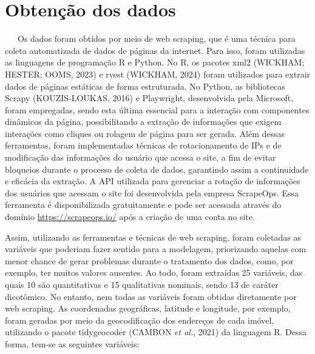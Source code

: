 \documentclass[
  12pt,
  a4paper,
]{scrreprt}
\begin{document}
\section{Obtenção dos dados}\label{obtenuxe7uxe3o-dos-dados}

~~~Os dados foram obtidos por meio de web scraping, que é uma técnica
para coleta automatizada de dados de páginas da internet. Para isso,
foram utilizadas as linguagens de programação R e Python. No R, os
pacotes xml2 (WICKHAM; HESTER; OOMS, 2023) e rvest (WICKHAM, 2024) foram
utilizados para extrair dados de páginas estáticas de forma estruturada.
No Python, as bibliotecas Scrapy (KOUZIS-LOUKAS, 2016) e Playwright,
desenvolvida pela Microsoft, foram empregadas, sendo esta última
essencial para a interação com componentes dinâmicos da página,
possibilitando a extração de informações que exigem interações como
cliques ou rolagem de página para ser gerada. Além dessas ferramentas,
foram implementadas técnicas de rotacionamento de IPs e de modificação
das informações do usuário que acessa o site, a fim de evitar bloqueios
durante o processo de coleta de dados, garantindo assim a continuidade e
eficácia da extração. A API utilizada para gerenciar a rotação de
informações dos usuários que acessam o site foi desenvolvida pela
empresa ScrapeOps. Essa ferramenta é disponibilizada gratuitamente e
pode ser acessada através do domínio \url{https://scrapeops.io/} após a
criação de uma conta no site.

\vspace{12pt}

Assim, utilizando as ferramentas e técnicas de web scraping, foram
coletadas as variáveis que poderiam fazer sentido para a modelagem,
priorizando aquelas com menor chance de gerar problemas durante o
tratamento dos dados, como, por exemplo, ter muitos valores ausentes. Ao
todo, foram extraídas 25 variáveis, das quais 10 são quantitativas e 15
qualitativas nominais, sendo 13 de caráter dicotômico. No entanto, nem
todas as variáveis foram obtidas diretamente por web scraping. As
coordenadas geográficas, latitude e longitude, por exemplo, foram
geradas por meio da geocodificação dos endereços de cada imóvel,
utilizando o pacote tidygeocoder (CAMBON \emph{et al.}, 2021) da
linguagem R. Dessa forma, tem-se as seguintes variáveis:
\end{document}
